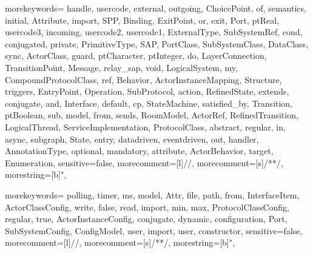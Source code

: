 


{morekeywords={
	handle,
	usercode,
	external,
	outgoing,
	ChoicePoint,
	of,
	semantics,
	initial,
	Attribute,
	import,
	SPP,
	Binding,
	ExitPoint,
	or,
	exit,
	Port,
	ptReal,
	usercode3,
	incoming,
	usercode2,
	usercode1,
	ExternalType,
	SubSystemRef,
	cond,
	conjugated,
	private,
	PrimitiveType,
	SAP,
	PortClass,
	SubSystemClass,
	DataClass,
	sync,
	ActorClass,
	guard,
	ptCharacter,
	ptInteger,
	do,
	LayerConnection,
	TransitionPoint,
	Message,
	relay_sap,
	void,
	LogicalSystem,
	my,
	CompoundProtocolClass,
	ref,
	Behavior,
	ActorInstanceMapping,
	Structure,
	triggers,
	EntryPoint,
	Operation,
	SubProtocol,
	action,
	RefinedState,
	extends,
	conjugate,
	and,
	Interface,
	default,
	cp,
	StateMachine,
	satisfied_by,
	Transition,
	ptBoolean,
	sub,
	model,
	from,
	sends,
	RoomModel,
	ActorRef,
	RefinedTransition,
	LogicalThread,
	ServiceImplementation,
	ProtocolClass,
	abstract,
	regular,
	in,
	async,
	subgraph,
	State,
	entry,
	datadriven,
	eventdriven,
	out,
	handler,
	AnnotationType,
	optional,
	mandatory,
	attribute,
	ActorBehavior,
	target,
	Enumeration,
}
sensitive=false,
morecomment=[l]{//},
morecomment=[s]{/*}{*/},
morestring=[b]",
} 


{morekeywords={
	polling,
	timer,
	ms,
	model,
	Attr,
	file,
	path,
	from,
	InterfaceItem,
	ActorClassConfig,
	write,
	false,
	read,
	import,
	min,
	max,
	ProtocolClassConfig,
	regular,
	true,
	ActorInstanceConfig,
	conjugate,
	dynamic,
	configuration,
	Port,
	SubSystemConfig,
	ConfigModel,
	user,
	import,
	user,
	constructor,
}
sensitive=false,
morecomment=[l]{//},
morecomment=[s]{/*}{*/},
morestring=[b]",
} 

